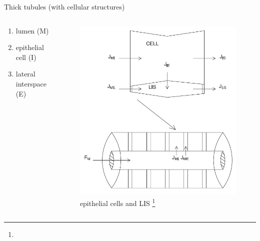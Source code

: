 \documentclass[serif]{beamer}
\begin{document}
\begin{frame}{Thick tubules (with cellular structures)}
    \begin{columns}
        \begin{column}{0.45\linewidth}
            \begin{enumerate}
                \item lumen (M)
                \item epithelial cell (I)
                \item lateral interspace (E)
            \end{enumerate}
        \end{column}

        \begin{column}{0.55\linewidth}
            \begin{figure}
                \centering
                \includegraphics[width=.75\textwidth]{figures/epithelium.png}
                \caption{epithelial cells and LIS \citep{Weinstein1998}\footnote[frame,1]{\tiny{}}}
            \end{figure}
        \end{column}
    \end{columns}
\end{frame}
\end{document}
